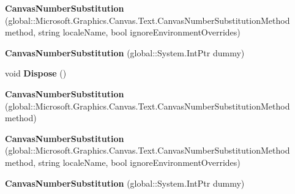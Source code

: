 \begin{DoxyCompactItemize}
\item 
\mbox{\label{class_microsoft_1_1_graphics_1_1_canvas_1_1_text_1_1_canvas_number_substitution_ae878982d7be90bf2b1ff752454f90f93}} 
{\bfseries Canvas\+Number\+Substitution} (global\+::\+Microsoft.\+Graphics.\+Canvas.\+Text.\+Canvas\+Number\+Substitution\+Method method, string locale\+Name, bool ignore\+Environment\+Overrides)
\item 
\mbox{\label{class_microsoft_1_1_graphics_1_1_canvas_1_1_text_1_1_canvas_number_substitution_a367a017a47cc1914c315d4594f461eaa}} 
{\bfseries Canvas\+Number\+Substitution} (global\+::\+System.\+Int\+Ptr dummy)
\item 
\mbox{\label{class_microsoft_1_1_graphics_1_1_canvas_1_1_text_1_1_canvas_number_substitution_ab79f8bfd20865299806189e031b32db1}} 
void {\bfseries Dispose} ()
\item 
\mbox{\label{class_microsoft_1_1_graphics_1_1_canvas_1_1_text_1_1_canvas_number_substitution_a23cd618feea7309cd4c3797c2969e6f3}} 
{\bfseries Canvas\+Number\+Substitution} (global\+::\+Microsoft.\+Graphics.\+Canvas.\+Text.\+Canvas\+Number\+Substitution\+Method method)
\item 
\mbox{\label{class_microsoft_1_1_graphics_1_1_canvas_1_1_text_1_1_canvas_number_substitution_ae878982d7be90bf2b1ff752454f90f93}} 
{\bfseries Canvas\+Number\+Substitution} (global\+::\+Microsoft.\+Graphics.\+Canvas.\+Text.\+Canvas\+Number\+Substitution\+Method method, string locale\+Name, bool ignore\+Environment\+Overrides)
\item 
\mbox{\label{class_microsoft_1_1_graphics_1_1_canvas_1_1_text_1_1_canvas_number_substitution_a367a017a47cc1914c315d4594f461eaa}} 
{\bfseries Canvas\+Number\+Substitution} (global\+::\+System.\+Int\+Ptr dummy)
\item 
\mbox{\label{class_microsoft_1_1_graphics_1_1_canvas_1_1_text_1_1_canvas_number_substitution_ab79f8bfd20865299806189e031b32db1}} 

\end{DoxyCompactItemize}
